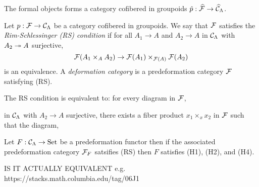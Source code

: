 \documentclass[12pt]{article}
\begin{document}
\begin{prop}
The formal objects forms a category cofibered in groupoids $\hat{p} : \widehat{\mathcal{F}} \to \widehat{\mathcal{C}}_\Lambda$.
\end{prop}

\begin{defn}
Let $p : \mathcal{F} \to \mathcal{C}_\Lambda$ be a category cofibered in groupoids. We say that $\mathcal{F}$ satisfies the \textit{Rim-Schlessinger (RS) condition} if for all $A_1 \to A$ and $A_2 \to A$ in $\mathcal{C}_\Lambda$ with $A_2 \twoheadrightarrow A$ surjective,
\[ \mathcal{F}(A_1 \times_A A_2) \to \mathcal{F}(A_1) \times_{\mathcal{F}(A)} \mathcal{F}(A_2) \]
is an equivalence. A \textit{deformation category} is a predeformation category $\mathcal{F}$ satisfying (RS).
\end{defn}

\begin{lemma}
The RS condition is equivalent to: for every diagram in $\mathcal{F}$,
\begin{center}
\quad {} \quad
{}
\end{center}
in $\mathcal{C}_\Lambda$ with $A_2 \to A$ surjective, there exists a fiber product $x_1 \times_x x_2$ in $\mathcal{F}$ such that the diagram,
\begin{center}
\quad {} \quad
{}
\end{center}
\end{lemma}

\begin{lemma}
Let $F : \mathcal{C}_\Lambda \to \mathrm{Set}$ be a predeformation functor then if the associated predeformation category $\mathcal{F}_F$ satsifies (RS) then $F$ satisfies (H1), (H2), and (H4).
\end{lemma}

\begin{rmk}
IS IT ACTUALLY EQUIVALENT e.g. https://stacks.math.columbia.edu/tag/06J1
\end{rmk}
\end{document}
